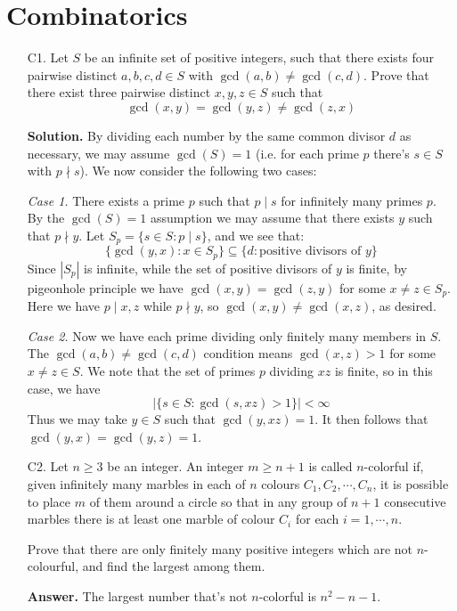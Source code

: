 \documentclass[11pt,a4paper]{article}
\begin{document}
	\section*{Combinatorics}
	\begin{enumerate}
		\item [C1.] 
		Let $S$ be an infinite set of positive integers, such that 
		there exists four pairwise distinct $a, b, c, d\in S$ with $\gcd(a, b)\neq \gcd(c, d)$. 
		Prove that there exist three pairwise distinct $x, y, z\in S$ such that 
		\[
		\gcd(x, y)=\gcd(y, z)\neq \gcd(z, x)
		\]
		
		\textbf{Solution.} 
		By dividing each number by the same common divisor $d$ as necessary, we may assume $\gcd(S)=1$ (i.e. for each prime $p$ there's $s\in S$ with $p\nmid s$). 
		We now consider the following two cases: 
		
		\emph{Case 1.} There exists a prime $p$ such that $p\mid s$ for infinitely many primes $p$. 
		By the $\gcd(S)=1$ assumption we may assume that there exists $y$ such that $p\nmid y$. 
		Let $S_p = \{s\in S: p\mid s\}$, 
		and we see that: 
		\[
		\{\gcd(y, x): x\in S_p\}\subseteq \{d: \text{positive divisors of }y\}
		\]
		Since $|S_p|$ is infinite, while the set of positive divisors of $y$ is finite, 
		by pigeonhole principle we have $\gcd(x, y)=\gcd(z, y)$ for some $x\neq z\in S_p$. 
		Here we have $p\mid x, z$ while $p\nmid y$, so $\gcd(x, y)\neq \gcd(x, z)$, as desired. 
		
		\emph{Case 2.} 
		Now we have each prime dividing only finitely many members in $S$. 
		The $\gcd(a, b)\neq \gcd(c, d)$ condition means $\gcd(x, z) > 1$ for some $x\neq z\in S$. 
		We note that the set of primes $p$ dividing $xz$ is finite, so in this case, we have 
		\[
		|\{s\in S: \gcd(s, xz) > 1\}| < \infty
		\]
		Thus we may take $y\in S$ such that $\gcd(y, xz)=1$. 
		It then follows that $\gcd(y, x)=\gcd(y, z)=1$. 
		
		\item [C2.] Let $n \ge 3$ be an integer. 
		An integer $m \ge n + 1$ is called $n$-colorful if, given infinitely many marbles in each of $n$ colours $C_1, C_2, \cdots , C_n$, 
		it is possible to place $m$ of them around a circle so that in any group of $n + 1$ consecutive marbles there is at least one marble of colour $C_i$ for each $i = 1, \cdots , n$.
		
		Prove that there are only finitely many positive integers which are not $n$-colourful, and find the largest among them.
		
		\textbf{Answer.} The largest number that's not $n$-colorful is $n^2-n-1$. 
		

\end{enumerate}
\end{document}
